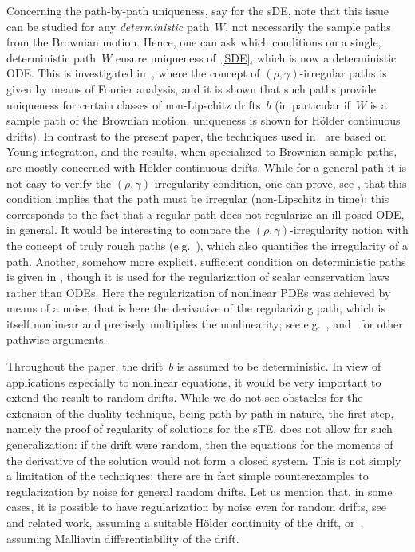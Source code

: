 \documentclass[a4paper,10pt]{article}
\newcommand\1{\mathbbm{1}}
\numberwithin{equation}{section}
\begin{document}
Concerning the path-by-path uniqueness, say for the sDE, note that this issue can be studied for any \emph{deterministic} path~$W$, not necessarily the sample paths from the Brownian motion. Hence, one can ask which conditions on a single, deterministic path~$W$ ensure uniqueness of~\eqref{SDE}, which is now a deterministic ODE. This is investigated in~\cite{CATGUB13}, where the concept of $(\rho,\gamma)$-irregular paths is given by means of Fourier analysis, and it is shown that such paths provide uniqueness for certain classes of non-Lipschitz drifts~$b$ (in particular if~$W$ is a sample path of the Brownian motion, uniqueness is shown for H\"older continuous drifts). In contrast to the present paper, the techniques used in~\cite{CATGUB13} are based on Young integration, and the results, when specialized to Brownian sample paths, are mostly concerned with H\"older continuous drifts. While for a general path it is not easy to verify the $(\rho,\gamma)$-irregularity condition, one can prove, see \cite[Proposition~1.4]{CHOGUB15},  that this condition implies that the path must be irregular (non-Lipschitz in time): this corresponds to the fact that a regular path does not regularize an ill-posed ODE, in general. It would be interesting to compare the $(\rho,\gamma)$-irregularity notion with the concept of truly rough paths (e.g.~\cite{FRISHE13}), which also quantifies the irregularity of a path. Another, somehow more explicit, sufficient condition on deterministic paths is given in \cite[equation (3.3)]{CHOGES19}, though it is used for the regularization of scalar conservation laws rather than ODEs. Here the regularization of nonlinear PDEs was achieved by means of a noise, that is here the derivative of the regularizing path, which is itself nonlinear and precisely multiplies the nonlinearity; see e.g.~\cite{CHOGES19,CHOGUB15,CHOGUB14}, and~\cite{GASGES19} for other pathwise arguments.

Throughout the paper, the drift~$b$ is assumed to be deterministic. In view of applications especially to nonlinear equations, it would be very important to extend the result to random drifts. While we do not see obstacles for the extension of the duality technique, being path-by-path in nature, the first step, namely the proof of regularity of solutions for the sTE, does not allow for such generalization: if the drift were random, then the equations for the moments of the derivative of the solution would not form a closed system. This is not simply a limitation of the techniques: there are in fact simple counterexamples to regularization by noise for general random drifts. Let us mention that, in some cases, it is possible to have regularization by noise even for random drifts, see~\cite{CATGUB13} and related work, assuming a suitable H\"older continuity of the drift, or~\cite{DUBREV16,OLIVEIRA19}, assuming Malliavin differentiability of the drift.
\end{document}
